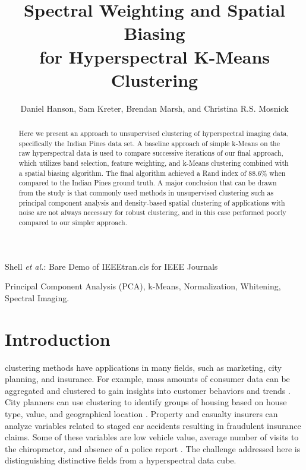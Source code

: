 \documentclass[journal]{IEEEtran}
\begin{document}
\title{Spectral Weighting and Spatial Biasing\\ for Hyperspectral K-Means Clustering}


\author{Daniel Hanson, Sam Kreter, Brendan Marsh, and Christina R.S. Mosnick}

{Shell \MakeLowercase{\textit{et al.}}: Bare Demo of IEEEtran.cls for IEEE Journals}

\maketitle

\begin{abstract}
Here we present an approach to unsupervised clustering of hyperspectral imaging data, specifically the Indian Pines data set. A baseline approach of simple k-Means on the raw hyperspectral data is used to compare successive iterations of our final approach, which utilizes band selection, feature weighting, and k-Means clustering combined with a spatial biasing algorithm. The final algorithm achieved a Rand index of 88.6\% when compared to the Indian Pines ground truth. A major conclusion that can be drawn from the study is that commonly used methods in unsupervised clustering such as principal component analysis and density-based spatial clustering of applications with noise are not always necessary for robust clustering, and in this case performed poorly compared to our simpler approach.
\end{abstract}

\begin{IEEEkeywords}
    Principal Component Analysis (PCA), k-Means, Normalization, Whitening, Spectral Imaging.
\end{IEEEkeywords}

\IEEEpeerreviewmaketitle

\section{Introduction}

 clustering methods have applications in many fields, such as marketing, city planning, and insurance. For example, mass amounts of consumer data can be aggregated and clustered to gain insights into customer behaviors and trends \cite{ClusterTutorial}. City planners can use clustering to identify groups of housing based on house type, value, and geographical location \cite{ClusterTutorial}. Property and casualty insurers can analyze variables related to staged car accidents resulting in fraudulent insurance claims. Some of these variables are low vehicle value, average number of visits to the chiropractor, and absence of a police report \cite{FraudAnalysis}. The challenge addressed here is distinguishing distinctive fields from a hyperspectral data cube.\\
\end{document}
